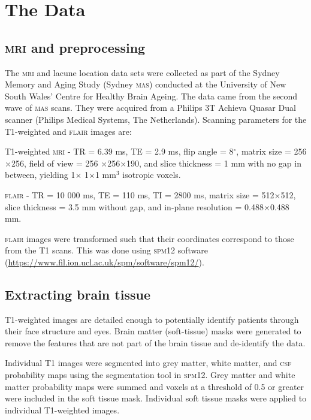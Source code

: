 %
%

\chapter{The Data}\label{model}

\section{\textsc{mri} and preprocessing}\label{data-mri}

The \textsc{mri} and lacune location data sets were collected as part of the Sydney Memory and Aging Study (Sydney \textsc{mas}) conducted at the University of New South Wales' Centre for Healthy Brain Ageing. The data came from the second wave of \textsc{mas} scans. They were acquired from a Philips 3T Achieva Quasar Dual scanner (Philips Medical Systems, The Netherlands). Scanning parameters for the T1-weighted and \textsc{flair} images are:

T1-weighted \textsc{mri} - TR = 6.39 ms, TE = 2.9 ms, flip angle = 8$^\circ$, matrix size = 256$\times$256, field of view = 256 $\times$256$\times$190, and slice thickness = 1 mm with no gap in between, yielding 1$\times$ 1$\times$1 mm$^3$ isotropic voxels.

\textsc{flair} - TR = 10 000 ms, TE = 110 ms, TI = 2800 ms, matrix size = 512$\times$512, slice thickness = 3.5 mm without gap, and in-plane resolution = 0.488$\times$0.488 mm.

\textsc{flair} images were transformed such that their coordinates correspond to those from the T1 scans. This was done using \textsc{spm12} software (\url{https://www.fil.ion.ucl.ac.uk/spm/software/spm12/}).

\section{Extracting brain tissue}\label{data-soft}

T1-weighted images are detailed enough to potentially identify patients through their face structure and eyes. Brain matter (soft-tissue) masks were generated to remove the features that are not part of the brain tissue and de-identify the data.

Individual T1 images were segmented into grey matter, white matter, and \textsc{csf} probability maps using the segmentation tool in \textsc{spm12}. Grey matter and white matter probability maps were summed and voxels at a threshold of 0.5 or greater were included in the soft tissue mask. Individual soft tissue masks were applied to individual T1-weighted images.

